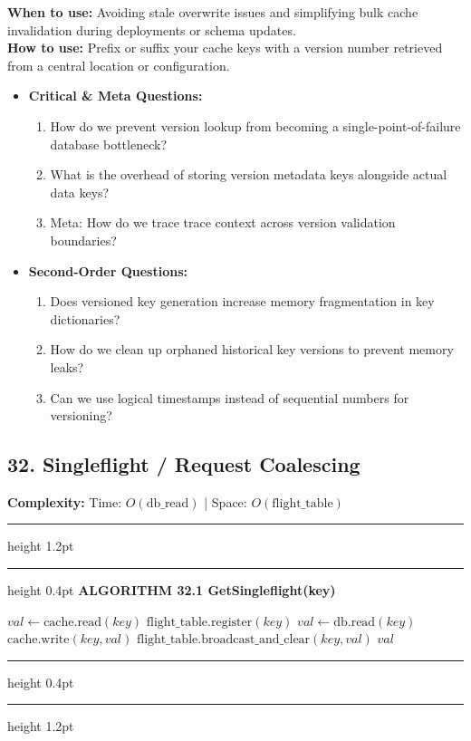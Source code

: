 \documentclass[11pt,a4paper]{article}
\newenvironment{textbookalgo}[2]{%
  \par\addvspace{1.2em}\noindent
  \hrule height 1.2pt
  \vspace{1.5pt}
  \hrule height 0.4pt
  \vspace{5pt}
  {\noindent\large\bfseries\sffamily ALGORITHM #1 \quad #2}
  \par\vspace{5pt}
  \RestyleAlgo{plain}
}{%
  \par\vspace{4pt}
  \hrule height 0.4pt
  \vspace{1.5pt}
  \hrule height 1.2pt
  \par\addvspace{1.2em}
}
\theoremstyle{definition}
\begin{document}
\noindent
\textbf{When to use:} Avoiding stale overwrite issues and simplifying bulk cache invalidation during deployments or schema updates.\\
\textbf{How to use:} Prefix or suffix your cache keys with a version number retrieved from a central location or configuration.
\begin{itemize}[leftmargin=*]
  \item[] \textbf{Critical \& Meta Questions:}
  \begin{enumerate}
    \item How do we prevent version lookup from becoming a single-point-of-failure database bottleneck?
    \item What is the overhead of storing version metadata keys alongside actual data keys?
    \item Meta: How do we trace trace context across version validation boundaries?
  \end{enumerate}
  \item[] \textbf{Second-Order Questions:}
  \begin{enumerate}
    \item Does versioned key generation increase memory fragmentation in key dictionaries?
    \item How do we clean up orphaned historical key versions to prevent memory leaks?
    \item Can we use logical timestamps instead of sequential numbers for versioning?
  \end{enumerate}
\end{itemize}
\medskip


\clearpage
\subsection{32. Singleflight / Request Coalescing}

\noindent
\textbf{Complexity:} Time: $O(\text{db\_read})$ | Space: $O(\text{flight\_table})$
\smallskip

\begin{textbookalgo}{32.1}{GetSingleflight(key)}
\begin{algorithm}[H]
$val \leftarrow \text{cache.read}(key)$\;
$\text{flight\_table.register}(key)$\;
$val \leftarrow \text{db.read}(key)$\;
$\text{cache.write}(key, val)$\;
$\text{flight\_table.broadcast\_and\_clear}(key, val)$\;
\Return $val$\;
\end{algorithm}
\end{textbookalgo}
\end{document}
